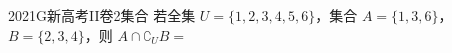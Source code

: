 
\begin{problem}{2021}{G}{新高考II卷}{2}{集合}
若全集 $ U=\{1,2,3,4,5,6\} $，集合 $ A=\{1,3,6\} $，$ B=\{2,3,4\} $，则 $ A\cap\complement_{U}B= $
\begin{choices}
\end{choices}
\end{problem}

\begin{answer}

\end{answer}

\begin{solutions}

\end{solutions}